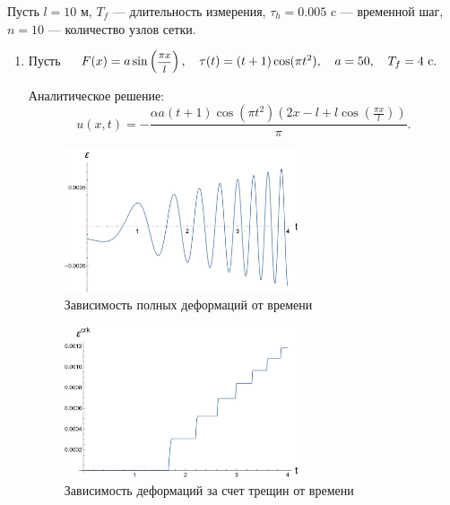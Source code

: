 \documentclass[12pt, a4paper]{article}
\begin{document}
Пусть $l = 10$ м, $T_f$ --- длительность измерения, $\tau_h = 0.005$ c --- временной шаг, $n = 10$ --- количество узлов сетки.
\begin{enumerate}
	\item Пусть $\quad F(x) = a \sin\left(\hbox{\footnotesize$\displaystyle\frac{\pi x}{l}$}\right),\quad \tau(t) = (t+1)\cos(\pi t^2),\quad a = 50,\quad T_f = 4 \text{ c}.$
	
	Аналитическое решение:
\[
 u(x, t) = -\dfrac{\alpha a (t+1) \cos (\pi t^2) (2x - l + l \cos (\tfrac{\pi x}{l}))}{\pi}.
\]

	   \begin{figure}[H]
	  	\centering
	  	\includegraphics[width=0.65\textwidth]{T2_1}
	  	\caption{Зависимость полных деформаций от времени}
	  	\label{fig:p4}
	  \end{figure}
	  
	  \begin{figure}[H]
	  	\centering
	  	\includegraphics[width=0.65\textwidth]{T2_2}
	  	\caption{Зависимость деформаций за счет трещин от времени}
	  	\label{fig:p5}
	  \end{figure}
	  	  

\end{enumerate}
\end{document}
